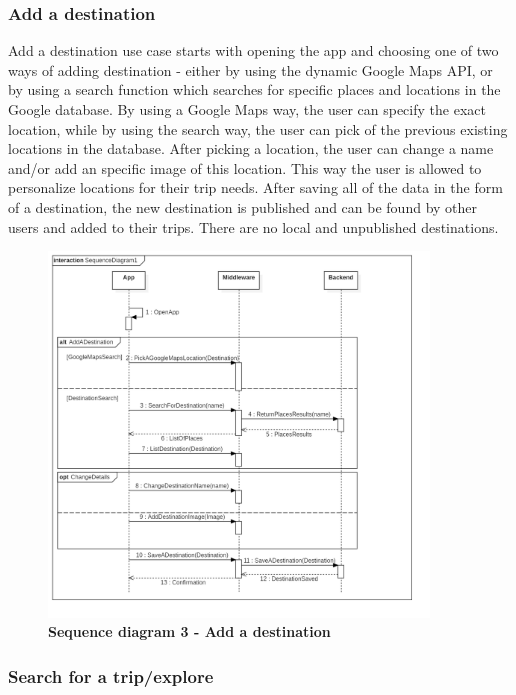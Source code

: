 \subsubsection{Add a destination}

\hspace{\parindent}Add a destination use case starts with opening the app and choosing one of two ways of adding destination - either by using the dynamic Google Maps API, or by using a search function which searches for specific places and locations in the Google database. By using a Google Maps way, the user can specify the exact location, while by using the search way, the user can pick of the previous existing locations in the database. After picking a location, the user can change a name and/or add an specific image of this location. This way the user is allowed to personalize locations for their trip needs. After saving all of the data in the form of a destination, the new destination is published and can be found by other users and added to their trips. There are no local and unpublished destinations.\\
\begin{figure}[!htb]
\centering
\includegraphics[width=0.9\textwidth]{../Graphs/Sequence3_Add_A_Destination.png}
\caption{\label{fig:dbapiuser}\textbf{Sequence diagram 3 - Add a destination}}
\end{figure}
\newpage
\subsubsection{Search for a trip/explore}
\newpage

